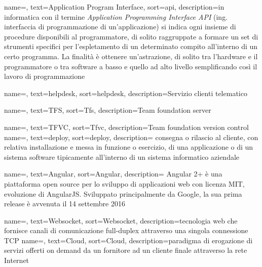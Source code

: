

{
    name=,
    text=Application Program Interface,
    sort=api,
    description={in informatica con il termine \emph{Application Programming Interface API} (ing. interfaccia di programmazione di un'applicazione) si indica ogni insieme di procedure disponibili al programmatore, di solito raggruppate a formare un set di strumenti specifici per l'espletamento di un determinato compito all'interno di un certo programma. La finalità è ottenere un'astrazione, di solito tra l'hardware e il programmatore o tra software a basso e quello ad alto livello semplificando così il lavoro di programmazione}
}



{
    name=,
    text=helpdesk,
    sort=helpdesk,
    description={Servizio clienti telematico}
}

{
    name=,
    text=TFS,
    sort=Tfs,
    description={Team foundation server}
}

{
    name=,
    text=TFVC,
    sort=Tfvc,
    description={Team foundation version control}
}
{
    name=,
    text=deploy,
    sort=deploy,
    description={ consegna o rilascio al cliente, con relativa installazione e messa in funzione o esercizio, di una applicazione o di un sistema software tipicamente all'interno di un sistema informatico aziendale}
}

{
    name=,
    text=Angular,
    sort=Angular,
    description={ Angular 2+ è una piattaforma open source per lo sviluppo di applicazioni web con licenza MIT, evoluzione di AngularJS. Sviluppato principalmente da Google, la sua prima release è avvenuta il 14 settembre 2016}
}

{
    name=,
    text=Websocket,
    sort=Websocket,
    description={tecnologia web che fornisce canali di comunicazione full-duplex attraverso una singola connessione TCP}
}
{
    name=,
    text=Cloud,
    sort=Cloud,
    description={paradigma di erogazione di servizi offerti on demand da un fornitore ad un cliente finale attraverso la rete Internet}
}

